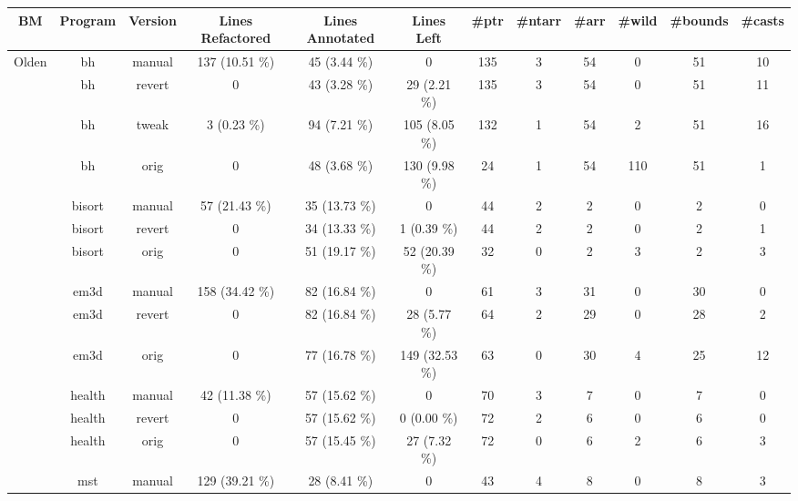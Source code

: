\tabcolsep=0.11cm
\begin{tabular}{||c c c c c c c c c c c c||}
\hline
BM & Program & Version & Lines Refactored & Lines Annotated & Lines Left & \#ptr & \#ntarr & \#arr & \#wild & \#bounds & \#casts \\ [0.5ex]
\hline\hline
\rowcolor{white}
Olden & bh & manual & 137 (10.51 \%) & 45 (3.44 \%) & {\color{gray} 0} & 135 & 3 & 54 & 0 & 51 & 10 \\
\hline
\rowcolor{white}
 & bh & revert & {\color{gray} 0} & 43 (3.28 \%) & 29 (2.21 \%) & 135 & 3 & 54 & 0 & 51 & 11 \\
\hline
\rowcolor{white}
 & bh & tweak & 3 (0.23 \%) & 94 (7.21 \%) & 105 (8.05 \%) & 132 & 1 & 54 & 2 & 51 & 16 \\
\hline
\rowcolor{white}
 & bh & orig & {\color{gray} 0} & 48 (3.68 \%) & 130 (9.98 \%) & 24 & 1 & 54 & 110 & 51 & 1 \\
\hline
\rowcolor[rgb]{0.8,0.8,0.8}
 & bisort & manual & 57 (21.43 \%) & 35 (13.73 \%) & {\color{gray} 0} & 44 & 2 & 2 & 0 & 2 & 0 \\
\hline
\rowcolor[rgb]{0.8,0.8,0.8}
 & bisort & revert & {\color{gray} 0} & 34 (13.33 \%) & 1 (0.39 \%) & 44 & 2 & 2 & 0 & 2 & 1 \\
\hline
\rowcolor[rgb]{0.8,0.8,0.8}
 & bisort & orig & {\color{gray} 0} & 51 (19.17 \%) & 52 (20.39 \%) & 32 & 0 & 2 & 3 & 2 & 3 \\
\hline
\rowcolor{white}
 & em3d & manual & 158 (34.42 \%) & 82 (16.84 \%) & {\color{gray} 0} & 61 & 3 & 31 & 0 & 30 & 0 \\
\hline
\rowcolor{white}
 & em3d & revert & {\color{gray} 0} & 82 (16.84 \%) & 28 (5.77 \%) & 64 & 2 & 29 & 0 & 28 & 2 \\
\hline
\rowcolor{white}
 & em3d & orig & {\color{gray} 0} & 77 (16.78 \%) & 149 (32.53 \%) & 63 & 0 & 30 & 4 & 25 & 12 \\
\hline
\rowcolor[rgb]{0.8,0.8,0.8}
 & health & manual & 42 (11.38 \%) & 57 (15.62 \%) & {\color{gray} 0} & 70 & 3 & 7 & 0 & 7 & 0 \\
\hline
\rowcolor[rgb]{0.8,0.8,0.8}
 & health & revert & {\color{gray} 0} & 57 (15.62 \%) & 0 (0.00 \%) & 72 & 2 & 6 & 0 & 6 & 0 \\
\hline
\rowcolor[rgb]{0.8,0.8,0.8}
 & health & orig & {\color{gray} 0} & 57 (15.45 \%) & 27 (7.32 \%) & 72 & 0 & 6 & 2 & 6 & 3 \\
\hline
\rowcolor{white}
 & mst & manual & 129 (39.21 \%) & 28 (8.41 \%) & {\color{gray} 0} & 43 & 4 & 8 & 0 & 8 & 3 \\

\end{tabular}
